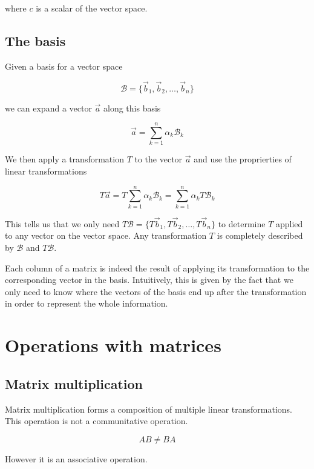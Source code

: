 \documentclass[a4paper]{article}
\begin{document}
where \(c\) is a scalar of the vector space.

\subsection{The basis}

Given a basis for a vector space

\[
    \mathcal{B}=\{\vec{b}_1, \vec{b}_2, \ldots, \vec{b}_n\}
\]

we can expand a vector \(\vec{a}\) along this basis

\[
    \vec{a} = \sum_{k=1}^{n} \alpha_k \mathcal{B}_k
\]

We then apply a transformation \(T\) to the vector \(\vec{a}\) and use the proprierties of
linear transformations

\[
    T\vec{a}
    = T\sum_{k=1}^{n} \alpha_k \mathcal{B}_k
    = \sum_{k=1}^{n} \alpha_k T\mathcal{B}_k
\]

This tells us that we only need \(T\mathcal{B}=\{T\vec{b}_1, T\vec{b}_2, \ldots, T\vec{b}_n\}\)
to determine \(T\) applied to any vector on the vector space.
Any transformation \(T\) is completely described by \(\mathcal{B}\)
and \(T\mathcal{B}\).

Each column of a matrix is indeed the result of applying its transformation
to the corresponding vector in the basis.
Intuitively, this is given by the fact that we only need to know where the vectors of the basis
end up after the transformation in order to represent the whole information.


%
%

\pagebreak

\section{Operations with matrices}

\subsection{Matrix multiplication}

Matrix multiplication forms a composition of multiple linear transformations. \\
This operation is not a communitative operation.

\[
    AB\neq BA
\]

However it is an associative operation.
\end{document}
